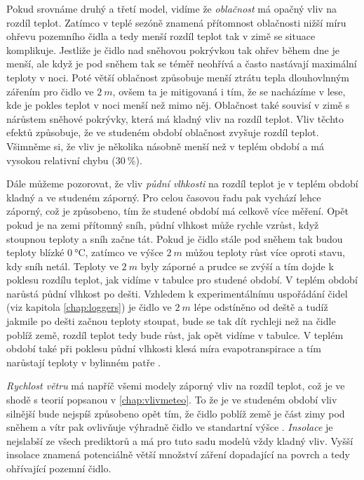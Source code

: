 Pokud srovnáme druhý a třetí model, vidíme že \textit{oblačnost} má opačný vliv na rozdíl teplot. Zatímco v teplé sezóně znamená přítomnost oblačnosti nižší míru ohřevu pozemního čidla a tedy menší rozdíl teplot \parencite{snow_deFrenneForestMicroclimates, cloud_overwinteringclusters} tak v zimě se situace komplikuje. Jestliže je čidlo nad sněhovou pokrývkou tak ohřev během dne je menší, ale když je pod sněhem tak se téměř neohřívá a často nastávají maximální teploty v noci. Poté větší oblačnost způsobuje menší ztrátu tepla dlouhovlnným zářením pro čidlo ve $\SI{2}{m}$, ovšem ta je mitigovaná i tím, že se nacházíme v lese, kde je pokles teplot v noci menší než mimo něj. Oblačnost také souvisí v zimě s nárůstem sněhové pokrývky, která má kladný vliv na rozdíl teplot. Vliv těchto efektů způsobuje, že ve studeném období oblačnost zvyšuje rozdíl teplot. Všimněme si, že vliv je několika násobně menší než v teplém období a má vysokou relativní chybu ($\SI{30}{\%}$).

Dále můžeme pozorovat, že vliv \textit{půdní vlhkosti} na rozdíl teplot je v teplém období kladný a ve studeném záporný. Pro celou časovou řadu pak vychází lehce záporný, což je způsobeno, tím že studené období má celkově více měření. Opět pokud je na zemi přítomný sníh, půdní vlhkost může rychle vzrůst, když stoupnou teploty a sníh začne tát. Pokud je čidlo stále pod sněhem tak budou teploty blízké $\SI{0}{\celsius}$, zatímco ve výšce $\SI{2}{m}$ můžou teploty růst více oproti stavu, kdy sníh netál. Teploty ve $\SI{2}{m}$ byly záporné a prudce se zvýší a tím dojde k poklesu rozdílu teplot, jak vidíme v tabulce pro studené období. V teplém období narůstá půdní vlhkost po dešti. Vzhledem k experimentálnímu uspořádání čidel (viz kapitola \ref{chap:loggers}) je čidlo ve $\SI{2}{m}$ lépe odstíněno od deště a tudíž jakmile po dešti začnou teploty stoupat, bude se tak dít rychleji než na čidle poblíž země, rozdíl teplot tedy bude růst, jak opět vidíme v tabulce. V teplém období také při poklesu půdní vlhkosti klesá míra evapotranspirace a tím narůstají teploty v bylinném patře \parencite{snow_deFrenneForestMicroclimates}.

\textit{Rychlost větru} má napříč všemi modely záporný vliv na rozdíl teplot, což je ve shodě s teorií popsanou v \ref{chap:vlivmeteo}. To že je ve studeném období vliv silnější bude nejspíš způsobeno opět tím, že čidlo poblíž země je část zimy pod sněhem a vítr pak ovlivňuje výhradně čidlo ve standartní výšce \parencite{wind_contrastingmicroclimates}. \textit{Insolace} je nejslabší ze všech prediktorů a má pro tuto sadu modelů vždy kladný vliv. Vyšší insolace znamená potenciálně větší množství záření dopadající na povrch a tedy ohřívající pozemní čidlo.

